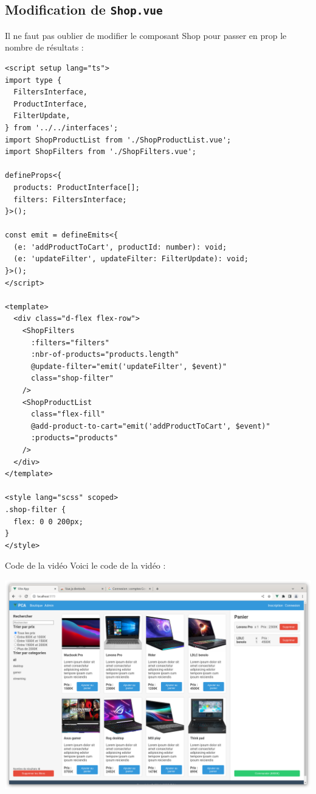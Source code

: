 \subsection{Modification de {\tt Shop.vue}}
Il ne faut pas oublier de modifier le composant {\color{monOrange} Shop} pour passer en {\color{monOrange} prop} le nombre de résultats :
\begin{verbatim}
<script setup lang="ts">
import type {
  FiltersInterface,
  ProductInterface,
  FilterUpdate,
} from '../../interfaces';
import ShopProductList from './ShopProductList.vue';
import ShopFilters from './ShopFilters.vue';

defineProps<{
  products: ProductInterface[];
  filters: FiltersInterface;
}>();

const emit = defineEmits<{
  (e: 'addProductToCart', productId: number): void;
  (e: 'updateFilter', updateFilter: FilterUpdate): void;
}>();
</script>

<template>
  <div class="d-flex flex-row">
    <ShopFilters
      :filters="filters"
      :nbr-of-products="products.length"
      @update-filter="emit('updateFilter', $event)"
      class="shop-filter"
    />
    <ShopProductList
      class="flex-fill"
      @add-product-to-cart="emit('addProductToCart', $event)"
      :products="products"
    />
  </div>
</template>

<style lang="scss" scoped>
.shop-filter {
  flex: 0 0 200px;
}
</style>
\end{verbatim}
Code de la vidéo
Voici le code de la vidéo :
\begin{center}
\includegraphics[width=15cm]{images/image28.png}
\end{center}
